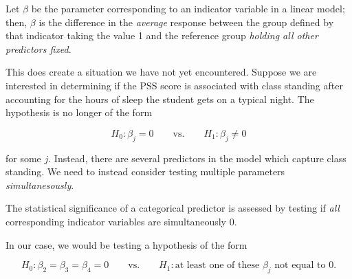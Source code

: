 \documentclass[
  letterpaper,
  DIV=11,
  numbers=noendperiod]{scrreprt}
\theoremstyle{definition}
\theoremstyle{definition}
\theoremstyle{remark}
\begin{document}
\begin{tcolorbox}[enhanced jigsaw, bottomrule=.15mm, titlerule=0mm, bottomtitle=1mm, colback=white, coltitle=black, rightrule=.15mm, leftrule=.75mm, toprule=.15mm, toptitle=1mm, left=2mm, opacityback=0, colframe=quarto-callout-note-color-frame, breakable, title=\textcolor{quarto-callout-note-color}{\faInfo}\hspace{0.5em}{Interpretation of Coefficient for Indicator}, arc=.35mm, colbacktitle=quarto-callout-note-color!10!white, opacitybacktitle=0.6]

Let \(\beta\) be the parameter corresponding to an indicator variable in
a linear model; then, \(\beta\) is the difference in the \emph{average}
response between the group defined by that indicator taking the value 1
and the reference group \emph{holding all other predictors fixed}.

\end{tcolorbox}

This does create a situation we have not yet encountered. Suppose we are
interested in determining if the PSS score is associated with class
standing after accounting for the hours of sleep the student gets on a
typical night. The hypothesis is no longer of the form

\[H_0: \beta_j = 0 \qquad \text{vs.} \qquad H_1: \beta_j \neq 0\]

for some \(j\). Instead, there are several predictors in the model which
capture class standing. We need to instead consider testing multiple
parameters \emph{simultanesously}.

\begin{tcolorbox}[enhanced jigsaw, bottomrule=.15mm, titlerule=0mm, bottomtitle=1mm, colback=white, coltitle=black, rightrule=.15mm, leftrule=.75mm, toprule=.15mm, toptitle=1mm, left=2mm, opacityback=0, colframe=quarto-callout-tip-color-frame, breakable, title=\textcolor{quarto-callout-tip-color}{\faLightbulb}\hspace{0.5em}{Big Idea}, arc=.35mm, colbacktitle=quarto-callout-tip-color!10!white, opacitybacktitle=0.6]

The statistical significance of a categorical predictor is assessed by
testing if \emph{all} corresponding indicator variables are
simultaneously 0.

\end{tcolorbox}

In our case, we would be testing a hypothesis of the form

\[H_0: \beta_2 = \beta_3 = \beta_4 = 0 \qquad \text{vs.} \qquad H_1: \text{at least one of these } \beta_j \text{ not equal to 0}.\]
\end{document}
